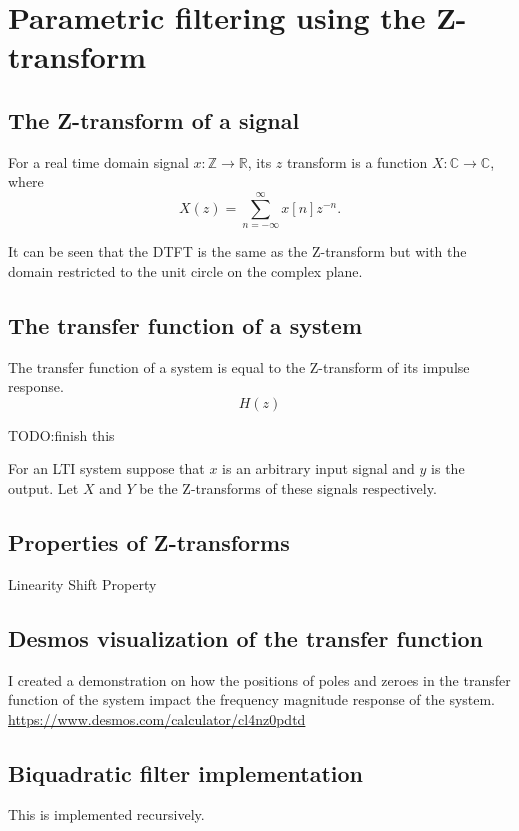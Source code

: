 \section{Parametric filtering using the Z-transform}
\subsection{The Z-transform of a signal}
For a real time domain signal $x:\mathbb{Z}\to\mathbb{R}$, its $z$ transform is a function $X:\mathbb{C}\to\mathbb{C}$, where
$$X(z)=\sum_{n=-\infty}^{\infty}x[n]z^{-n}.$$

It can be seen that the DTFT is the same as the Z-transform but with the domain restricted to the 
unit circle on the complex plane.

\subsection{The transfer function of a system}
The transfer function of a system is equal to the Z-transform of its impulse response.
$$H(z)$$

TODO:finish this

For an LTI system suppose that $x$ is an arbitrary input signal and $y$ is the output.
Let $X$ and $Y$ be the Z-transforms of these signals respectively.

\subsection{Properties of Z-transforms}
Linearity
Shift Property


\subsection{Desmos visualization of the transfer function}
I created a demonstration on how the positions of poles and zeroes in the 
transfer function of the system impact the frequency magnitude response of the system.
\href{https://www.desmos.com/calculator/cl4nz0pdtd}{https://www.desmos.com/calculator/cl4nz0pdtd}

\subsection{Biquadratic filter implementation}
This is implemented recursively.